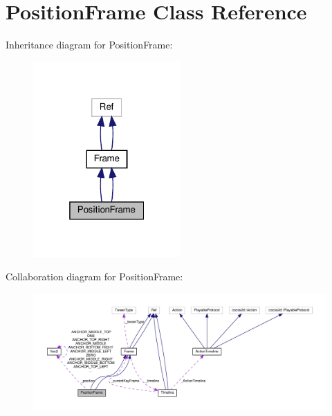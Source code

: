 \hypertarget{classPositionFrame}{}\section{Position\+Frame Class Reference}
\label{classPositionFrame}


Inheritance diagram for Position\+Frame\+:
\nopagebreak
\begin{figure}[H]
\begin{center}
\leavevmode
\includegraphics[width=160pt]{classPositionFrame__inherit__graph}
\end{center}
\end{figure}


Collaboration diagram for Position\+Frame\+:
\nopagebreak
\begin{figure}[H]
\begin{center}
\leavevmode
\includegraphics[width=350pt]{classPositionFrame__coll__graph}
\end{center}
\end{figure}
